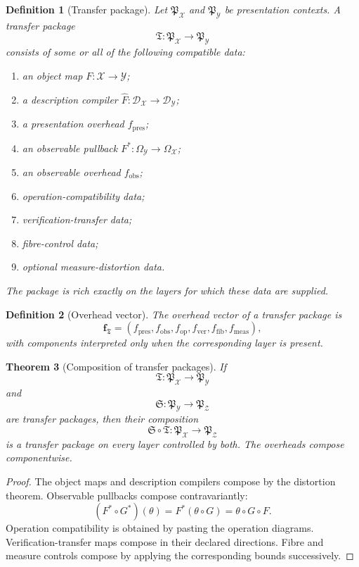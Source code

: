 \documentclass[11pt]{article}
\newtheorem{theorem}{Theorem}[section]
\newtheorem{definition}[theorem]{Definition}
\begin{document}
\begin{definition}[Transfer package]
Let \(\mathfrak P_\mathcal X\) and \(\mathfrak P_\mathcal Y\) be presentation contexts. A transfer package
\[
\mathfrak T:\mathfrak P_\mathcal X\to\mathfrak P_\mathcal Y
\]
consists of some or all of the following compatible data:
\begin{enumerate}[label=(\roman*)]
\item an object map \(F:\mathcal X\to\mathcal Y\);
\item a description compiler \(\widehat F:\mathcal D_\mathcal X\to\mathcal D_\mathcal Y\);
\item a presentation overhead \(f_{\mathrm{pres}}\);
\item an observable pullback \(F^\ast:\Omega_\mathcal Y\to\Omega_\mathcal X\);
\item an observable overhead \(f_{\mathrm{obs}}\);
\item operation-compatibility data;
\item verification-transfer data;
\item fibre-control data;
\item optional measure-distortion data.
\end{enumerate}
The package is rich exactly on the layers for which these data are supplied.
\end{definition}

\begin{definition}[Overhead vector]
The overhead vector of a transfer package is
\[
\mathbf f_\mathfrak T
=
(f_{\mathrm{pres}},f_{\mathrm{obs}},f_{\mathrm{op}},f_{\mathrm{ver}},f_{\mathrm{fib}},f_{\mathrm{meas}}),
\]
with components interpreted only when the corresponding layer is present.
\end{definition}

\begin{theorem}[Composition of transfer packages]
If
\[
\mathfrak T:\mathfrak P_\mathcal X\to\mathfrak P_\mathcal Y
\]
and
\[
\mathfrak S:\mathfrak P_\mathcal Y\to\mathfrak P_\mathcal Z
\]
are transfer packages, then their composition
\[
\mathfrak S\circ\mathfrak T:\mathfrak P_\mathcal X\to\mathfrak P_\mathcal Z
\]
is a transfer package on every layer controlled by both. The overheads compose componentwise.
\end{theorem}

\begin{proof}
The object maps and description compilers compose by the distortion theorem. Observable pullbacks compose contravariantly:
\[
(F^\ast\circ G^\ast)(\theta)
=
F^\ast(\theta\circ G)
=
\theta\circ G\circ F.
\]
Operation compatibility is obtained by pasting the operation diagrams. Verification-transfer maps compose in their declared directions. Fibre and measure controls compose by applying the corresponding bounds successively.
\end{proof}
\end{document}
